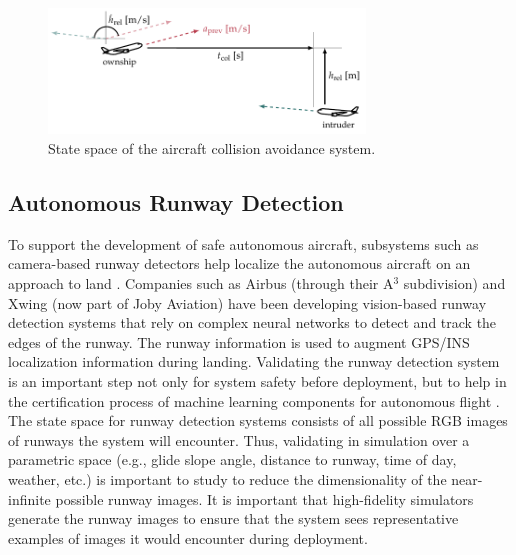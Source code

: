 \begin{figure}[t!]
    \centering
    \includegraphics[width=0.75\textwidth]{diagrams/background/cas}
    \hspace*{1cm}
    \caption{State space of the aircraft collision avoidance system.}
    \label{fig:cas}
\end{figure}


\subsection{Autonomous Runway Detection}
To support the development of safe autonomous aircraft, subsystems such as camera-based runway detectors help localize the autonomous aircraft on an approach to land \cite{gautam2014survey}.
Companies such as Airbus (through their A$^3$ subdivision) \cite{airbus2019wayfinder} and Xwing (now part of Joby Aviation) \cite{durand2023formal} have been developing vision-based runway detection systems that rely on complex neural networks to detect and track the edges of the runway.
The runway information is used to augment GPS/INS localization information during landing.
Validating the runway detection system is an important step not only for system safety before deployment, but to help in the certification process of machine learning components for autonomous flight \cite{durand2023formal}.
The state space for runway detection systems consists of all possible RGB images of runways the system will encounter.
Thus, validating in simulation over a parametric space (e.g., glide slope angle, distance to runway, time of day, weather, etc.) is important to study to reduce the dimensionality of the near-infinite possible runway images.
It is important that high-fidelity simulators generate the runway images to ensure that the system sees representative examples of images it would encounter during deployment.

